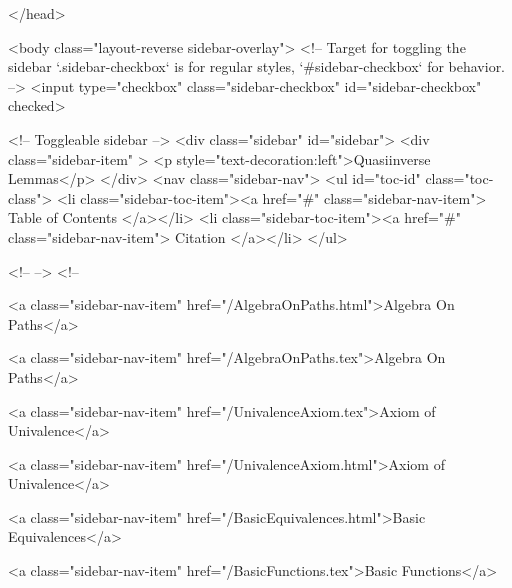   
</head>




  <body class="layout-reverse sidebar-overlay">
    <!-- Target for toggling the sidebar `.sidebar-checkbox` is for regular
     styles, `#sidebar-checkbox` for behavior. -->
<input type="checkbox" class="sidebar-checkbox" id="sidebar-checkbox" checked>

<!-- Toggleable sidebar -->
<div class="sidebar" id="sidebar">
  <div class="sidebar-item" >
    <p style="text-decoration:left">Quasiinverse Lemmas</p>
  </div>
  <nav class="sidebar-nav">
    <ul id="toc-id" class="toc-class">
  <li class="sidebar-toc-item"><a href="#" class="sidebar-nav-item"> Table of Contents </a></li>
  <li class="sidebar-toc-item"><a href="#" class="sidebar-nav-item"> Citation </a></li>
</ul>


    <!--  -->
    <!-- 
      
    
      
    
      
    
      
    
      
        
      
    
      
        
          <a class="sidebar-nav-item" href="/AlgebraOnPaths.html">Algebra On Paths</a>
        
      
    
      
        
          <a class="sidebar-nav-item" href="/AlgebraOnPaths.tex">Algebra On Paths</a>
        
      
    
      
        
          <a class="sidebar-nav-item" href="/UnivalenceAxiom.tex">Axiom of Univalence</a>
        
      
    
      
        
          <a class="sidebar-nav-item" href="/UnivalenceAxiom.html">Axiom of Univalence</a>
        
      
    
      
        
          <a class="sidebar-nav-item" href="/BasicEquivalences.html">Basic Equivalences</a>
        
      
    
      
        
          <a class="sidebar-nav-item" href="/BasicFunctions.tex">Basic Functions</a>
        

